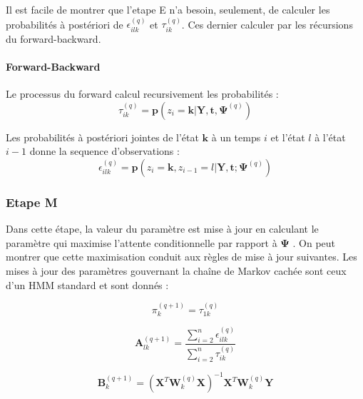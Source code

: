 \documentclass[11pt]{article}
\newcommand{\bsX}{\boldsymbol{X}}
\newcommand{\bsp}{\boldsymbol{p}}
\newcommand{\bsk}{\boldsymbol{k}}
\newcommand{\bst}{\boldsymbol{t}}
\newcommand{\bsW}{\boldsymbol{W}}
\newcommand{\ciz}{\textit{z}}
\newcommand{\cil}{\textit{l}}
\newcommand{\cii}{\textit{i}}
\newcommand{\sumttn}{\sum_{i=2}^{n}}
\newcommand{\bY}{\mathbf{Y}}
\newcommand{\bA}{\mathbf{A}}
\newcommand{\bB}{\mathbf{B}}
\newcommand{\bsPsi}{\boldsymbol{\Psi}}
\begin{document}
Il est facile de montrer que l'etape E n'a besoin, seulement, de calculer les probabilités à postériori de $\epsilon_{ilk}^{(q)}$ et $\tau_{ik}^{(q)}$. Ces dernier calculer par les récursions du forward-backward. \\



\paragraph{Forward-Backward}

Le processus du forward calcul recursivement les probabilités :\\

\begin{equation}
\tau_{ik}^{(q)}=\bsp( \ciz_{i} = \bsk | \bY,\bst, \bsPsi^{(q)}) 
\end{equation}

Les probabilités à postériori jointes de l'état $\bsk$ à un temps $\cii$ et l'état $\cil$ à l'état $\cii-1$ donne la sequence d'observations : \\

\begin{equation}
\epsilon_{ilk}^{(q)} = \bsp (\ciz_{i} = \bsk, \ciz_{i-1} = \cil | \bY, \bst ; \bsPsi^{(q)})
\end{equation}


\subsubsection{Etape M}

Dans cette étape, la valeur du paramètre est mise à jour en calculant le paramètre qui maximise l'attente conditionnelle par rapport à $\bsPsi$ . On peut montrer que cette maximisation conduit aux règles de mise à jour suivantes. Les mises à jour des paramètres gouvernant la chaîne de Markov cachée sont ceux d’un HMM standard et sont donnés :  


\begin{equation}
\pi_{k}^{(q+1)}=\tau_{1k}^{(q)}
\end{equation}

\begin{equation}
\bA_{lk}^{(q+1)}= \frac{\sumttn \epsilon_{ilk}^{(q)}}{\sumttn \tau_{ik}^{(q)}}
\end{equation}

\begin{equation}
\bB_{k}^{(q+1)}= ( \bsX^{T} \bsW_{k}^{(q)} \bsX)^{-1} \bsX^{T} \bsW_{k}^{(q)} \bY
\end{equation}
\end{document}
